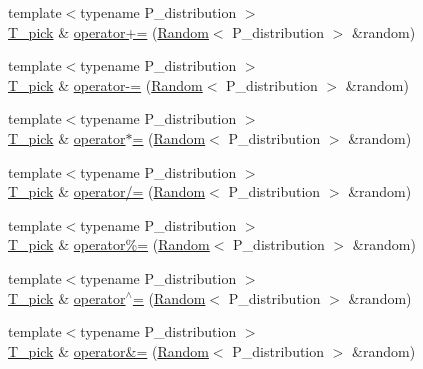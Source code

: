\begin{DoxyCompactItemize}
\item 
{\footnotesize template$<$typename P\+\_\+distribution $>$ }\\\hyperlink{classVectorPick_ab257fd713ce0f2a81bc79059cec93ac9}{T\+\_\+pick} \& \hyperlink{classVectorPick_a44277f0cfff914a555180515fb2eef9d}{operator+=} (\hyperlink{classRandom}{Random}$<$ P\+\_\+distribution $>$ \&random)
\item 
{\footnotesize template$<$typename P\+\_\+distribution $>$ }\\\hyperlink{classVectorPick_ab257fd713ce0f2a81bc79059cec93ac9}{T\+\_\+pick} \& \hyperlink{classVectorPick_a8bd42378b0f68b7ba144e19e985a2810}{operator-\/=} (\hyperlink{classRandom}{Random}$<$ P\+\_\+distribution $>$ \&random)
\item 
{\footnotesize template$<$typename P\+\_\+distribution $>$ }\\\hyperlink{classVectorPick_ab257fd713ce0f2a81bc79059cec93ac9}{T\+\_\+pick} \& \hyperlink{classVectorPick_aff1b2707c3b9ef7b39ba57deae19b532}{operator$\ast$=} (\hyperlink{classRandom}{Random}$<$ P\+\_\+distribution $>$ \&random)
\item 
{\footnotesize template$<$typename P\+\_\+distribution $>$ }\\\hyperlink{classVectorPick_ab257fd713ce0f2a81bc79059cec93ac9}{T\+\_\+pick} \& \hyperlink{classVectorPick_aaf2ee627f7337eb7f25bc9df70bdd05b}{operator/=} (\hyperlink{classRandom}{Random}$<$ P\+\_\+distribution $>$ \&random)
\item 
{\footnotesize template$<$typename P\+\_\+distribution $>$ }\\\hyperlink{classVectorPick_ab257fd713ce0f2a81bc79059cec93ac9}{T\+\_\+pick} \& \hyperlink{classVectorPick_ab9c50d6e14f516ba1ccea6cffb944c46}{operator\%=} (\hyperlink{classRandom}{Random}$<$ P\+\_\+distribution $>$ \&random)
\item 
{\footnotesize template$<$typename P\+\_\+distribution $>$ }\\\hyperlink{classVectorPick_ab257fd713ce0f2a81bc79059cec93ac9}{T\+\_\+pick} \& \hyperlink{classVectorPick_a565c7f1965d3f58404a4ce9b5747500f}{operator$^\wedge$=} (\hyperlink{classRandom}{Random}$<$ P\+\_\+distribution $>$ \&random)
\item 
{\footnotesize template$<$typename P\+\_\+distribution $>$ }\\\hyperlink{classVectorPick_ab257fd713ce0f2a81bc79059cec93ac9}{T\+\_\+pick} \& \hyperlink{classVectorPick_a673cf93332c0d2944242da104c8b5d6d}{operator\&=} (\hyperlink{classRandom}{Random}$<$ P\+\_\+distribution $>$ \&random)

\end{DoxyCompactItemize}
